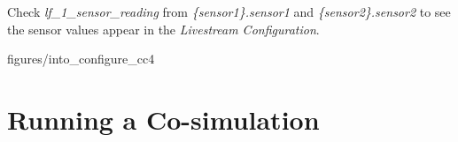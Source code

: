 \documentclass[11pt,a4paper]{../tutorial}
\begin{document}
\begin{instructions}
\item Check \emph{lf\_1\_sensor\_reading} from \emph{\{sensor1\}.sensor1} and \emph{\{sensor2\}.sensor2} to see the sensor values appear in the \emph{Live\-stream Configuration}.


    \begin{annotation}[width=0.85\linewidth,trim=0 200 0 0,clip]{figures/into_configure_cc4}
    \end{annotation}

\end{instructions}

\section{Running a Co-simulation}
\end{document}
